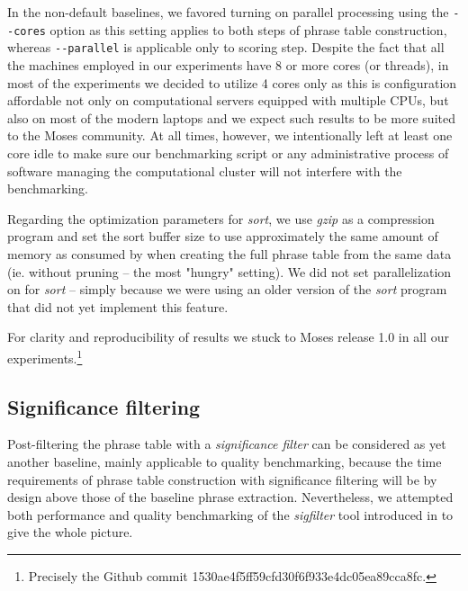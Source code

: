 In the non-default baselines, we favored turning on parallel processing using the \verb|--cores|
option as this setting applies to both steps of phrase table construction, whereas
\verb|--parallel| is applicable only to scoring step.
Despite the fact that all the machines employed in our experiments have 8 or more cores (or threads),
in most of the experiments we decided to utilize 4 cores only as this is configuration
affordable not only on computational servers equipped with multiple CPUs, but also on most
of the modern laptops and we expect such results to be more suited to the Moses community.
At all times, however, we intentionally left at least one core idle to make sure our
benchmarking script or any administrative process of software managing the computational
cluster will not interfere with the benchmarking.

Regarding the optimization parameters for \emph{sort}, we use \emph{gzip} as a compression
program and set the sort buffer size to use approximately the same
amount of memory as consumed by \eppex{} when creating the full phrase table from
the same data (ie. without pruning -- the most "hungry" setting).
We did not set parallelization on for \emph{sort} -- simply because we were using an older
version of the \emph{sort} program that did not yet implement this feature.

For clarity and reproducibility of results we stuck to Moses release 1.0 in all our 
experiments.\footnote{Precisely the Github commit 1530ae4f5ff59cfd30f6f933e4dc05ea89cca8fc.}

\subsection{Significance filtering}

Post-filtering the phrase table with a \emph{significance filter} can be considered as yet
another baseline, mainly applicable to quality benchmarking, because the time requirements
of phrase table construction with significance filtering will be by design above those of
the baseline phrase extraction.
Nevertheless, we attempted both performance and quality benchmarking of the \emph{sigfilter}
tool introduced in  to give the whole picture.

